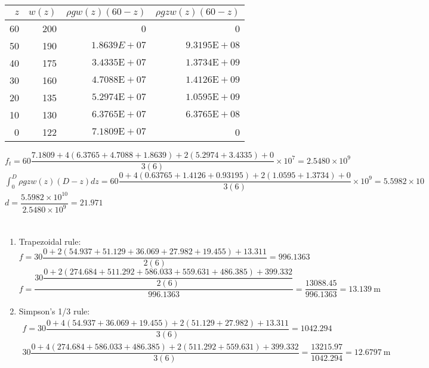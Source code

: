 \documentclass[../main.tex]{subfiles}
\begin{document}
\section{}
\begin{tabular}{rrrr}
\hline
$z$ & $w(z)$ & $\rho g w(z)(60-z)$ & $\rho g z w(z)(60-z)$ \\
\hline
60 & 200 & 0 & 0 \\
50 & 190 & $1.8639 E+07$ & $9.3195 \mathrm{E}+08$ \\
40 & 175 & $3.4335 \mathrm{E}+07$ & $1.3734 \mathrm{E}+09$ \\
30 & 160 & $4.7088 \mathrm{E}+07$ & $1.4126 \mathrm{E}+09$ \\
20 & 135 & $5.2974 \mathrm{E}+07$ & $1.0595 \mathrm{E}+09$ \\
10 & 130 & $6.3765 \mathrm{E}+07$ & $6.3765 \mathrm{E}+08$ \\
0 & 122 & $7.1809 \mathrm{E}+07$ & 0 \\
\hline
\end{tabular}
	\bigbreak
$f_{t}=60 \dfrac{7.1809+4(6.3765+4.7088+1.8639)+2(5.2974+3.4335)+0}{3(6)} \times 10^{7}=2.5480 \times 10^{9}$
	\bigbreak
$\displaystyle\int_{0}^{D} \rho g z w(z)(D-z) d z=60 \dfrac{0+4(0.63765+1.4126+0.93195)+2(1.0595+1.3734)+0}{3(6)} \times 10^{9}=5.5982 \times 10$
	\bigbreak
$d=\dfrac{5.5982 \times 10^{10}}{2.5480 \times 10^{9}}=21.971$
	\bigbreak


\section{}
\begin{enumerate}[label=\bfseries(\alph*)]
\item Trapezoidal rule:
	\bigbreak
$f=30 \dfrac{0+2(54.937+51.129+36.069+27.982+19.455)+13.311}{2(6)}=996.1363$
	\bigbreak
$f=\dfrac{30 \dfrac{0+2(274.684+511.292+586.033+559.631+486.385)+399.332}{2(6)}}{996.1363}=\dfrac{13088.45}{996.1363}=13.139 \mathrm{~m}$
	\bigbreak
\item Simpson's 1/3 rule:
	\bigbreak
$
\begin{gathered}
f=30 \dfrac{0+4(54.937+36.069+19.455)+2(51.129+27.982)+13.311}{3(6)}=1042.294 \\
30 \dfrac{0+4(274.684+586.033+486.385)+2(511.292+559.631)+399.332}{3(6)}=\dfrac{13215.97}{1042.294}=12.6797 \mathrm{~m}
\end{gathered}
$
	\bigbreak
\end{enumerate}
\end{document}
